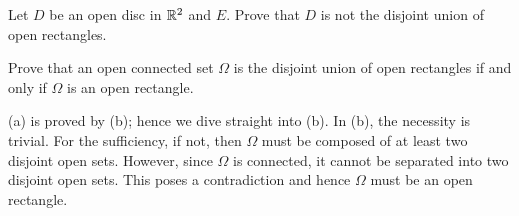\begin{exercise}
    \begin{thmenum}
        \item Let $D$ be an open disc in $\mathbb{R}^2$ and $E$. Prove 
        that $D$ is not the disjoint union of open rectangles.
        \item Prove that an open connected set $\Omega$ is the 
        disjoint union of open rectangles if and only if $\Omega$
        is an open rectangle.
    \end{thmenum}
\end{exercise}
\begin{pf}
    (a) is proved by (b); hence we dive straight into (b). In 
    (b), the necessity is trivial. For the sufficiency, if not,
    then $\Omega$ must be composed of at least two disjoint 
    open sets. However, since $\Omega$ is connected, it cannot
    be separated into two disjoint open sets. This poses a 
    contradiction and hence $\Omega$ must be an open rectangle. 
\end{pf}

